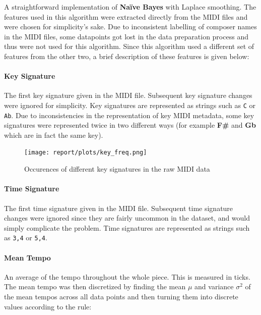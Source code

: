 \documentclass[11pt]{article}
\begin{document}
A straightforward implementation of \textbf{Naïve Bayes} with Laplace
smoothing. The features used in this algorithm were extracted directly
from the MIDI files and were chosen for simplicity's sake. Due to
inconsistent labelling of composer names in the MIDI files, some
datapoints got lost in the data preparation process and thus were not
used for this algorithm. Since this algorithm used a different set of
features from the other two, a brief description of these features is
given below:

\paragraph{Key Signature}\label{key-signature}

The first key signature given in the MIDI file. Subsequent key signature
changes were ignored for simplicity. Key signatures are represented as
strings such as \texttt{C} or \texttt{Ab}. Due to inconsistencies in the
representation of key MIDI metadata, some key signatures were
represented twice in two different ways (for example \textbf{F\#} and
\textbf{Gb} which are in fact the same key).

\begin{figure}[htbp!]
\centering
\texttt{[image: report/plots/key\_freq.png]}
\caption{Occurences of different key signatures in the raw MIDI data}
\end{figure}

\paragraph{Time Signature}\label{time-signature}

The first time signature given in the MIDI file. Subsequent time
signature changes were ignored since they are fairly uncommon in the
dataset, and would simply complicate the problem. Time signatures are
represented as strings such as \texttt{3,4} or \texttt{5,4}.

\paragraph{Mean Tempo}\label{mean-tempo}

An average of the tempo throughout the whole piece. This is measured in
ticks. The mean tempo was then discretized by finding the mean \(\mu\)
and variance \(\sigma^2\) of the mean tempos across all data points and
then turning them into discrete values according to the rule:
\end{document}

